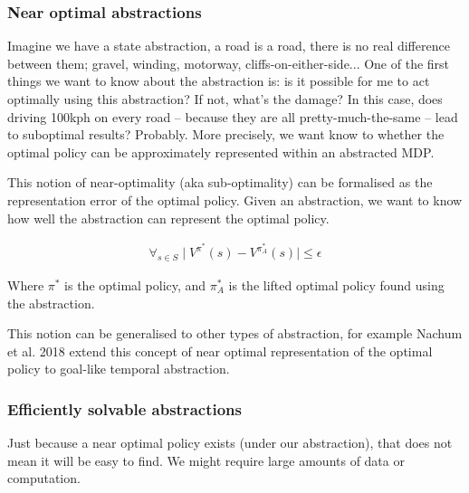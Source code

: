 \subsubsection{Near optimal abstractions}

Imagine we have a state abstraction, a road is a road, there is no real difference
between them; gravel, winding, motorway, cliffs-on-either-side...
One of the first things we want to know about the abstraction is:
is it possible for me to act optimally
using this abstraction? If not, what's the damage? In this case, does driving 100kph on every road --
because they are all pretty-much-the-same -- lead to suboptimal results? Probably.
More precisely, we want know to whether the optimal policy can be approximately represented within an abstracted MDP.

This notion of near-optimality (aka sub-optimality) can be formalised as the representation error of the optimal
policy. \cite{Abel2017} Given an abstraction, we want to know how well the abstraction can represent the optimal policy.

\begin{align}
\forall_{s\in S} \mid V^{\pi^* }(s) - V^{\pi_{A}^* }(s) \mid \le \epsilon
\end{align}

Where $\pi^{* }$ is the optimal policy, and $\pi_{A}^{* }$ is the lifted optimal
policy found using the abstraction.

This notion can be generalised to other types of abstraction, for example
Nachum et al. 2018 \cite{Nachum2018} extend this concept of near optimal
representation of the optimal policy to goal-like temporal abstraction. \footnotemark[13]


\subsubsection{Efficiently solvable abstractions}

Just because a near optimal policy exists (under our abstraction), that does not mean it will be easy to find.
We might require large amounts of data or computation.

